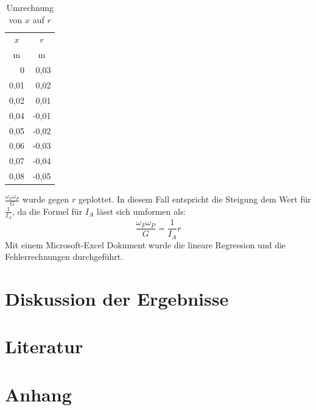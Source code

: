 \documentclass[11pt,a4paper]{article} %
\begin{document}
\begin{table}[h]
	\centering
	\begin{tabular*}{0.15\textwidth}{@{\extracolsep{\fill}}rr}
		\toprule
		\multicolumn{1}{c}{$x$} & \multicolumn{1}{c}{$r$}\\
		\multicolumn{1}{c}{m} & \multicolumn{1}{c}{m} \\
		\midrule
		0 &  0,03\\
		0,01 &  0,02\\
		0,02 &  0,01\\
		0,04 & -0,01\\
		0,05 & -0,02\\
		0,06 & -0,03\\
		0,07 & -0,04\\ 
		0,08 & -0,05\\
		\bottomrule
	\end{tabular*}
	\caption{Umrechnung von $x$ auf $r$}
	\label{tabelle}
\end{table}

$\frac{\omega_F\omega_P}{G}$ wurde gegen $r$ geplottet. In diesem Fall entspricht die Steigung dem Wert für $\frac{1}{I_A}$, da die Formel für $I_A$ lässt sich umformen als:
$$\frac{\omega_F\omega_P}{G} = \frac{1}{I_A}r$$ 
Mit einem Microsoft-Excel Dokument wurde die lineare Regression und die Fehlerrechnungen durchgeführt. 

\section{Diskussion der Ergebnisse}

\section{Literatur}

\section{Anhang}
\end{document}
